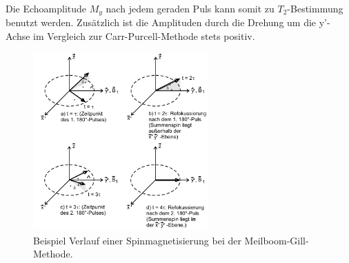 Die Echoamplitude $M_y$ nach jedem geraden Puls kann somit zu
$T_2$-Bestimmung benutzt werden.
Zusätzlich ist die Amplituden durch die Drehung
um die y'-Achse im Vergleich zur Carr-Purcell-Methode stets positiv.
\begin{figure}
  \centering
  \centering
  \includegraphics[width=0.6\textwidth]{mei-gil.PNG}
  \caption{Beispiel Verlauf einer Spinmagnetisierung bei
  der Meilboom-Gill-Methode.\cite{sample}}
  \label{fig:mei-gil}
\end{figure}

